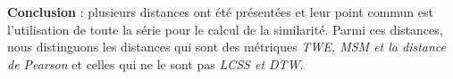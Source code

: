 {\bf Conclusion} : plusieurs distances ont \'et\'e pr\'esent\'ees et leur point commun est l'utilisation de toute la s\'erie pour le calcul de la similarit\'e.
Parmi ces distances, nous distinguons les distances qui sont des m\'etriques {\em TWE, MSM et la distance de Pearson} et celles qui ne le sont pas {\em LCSS et DTW}.

